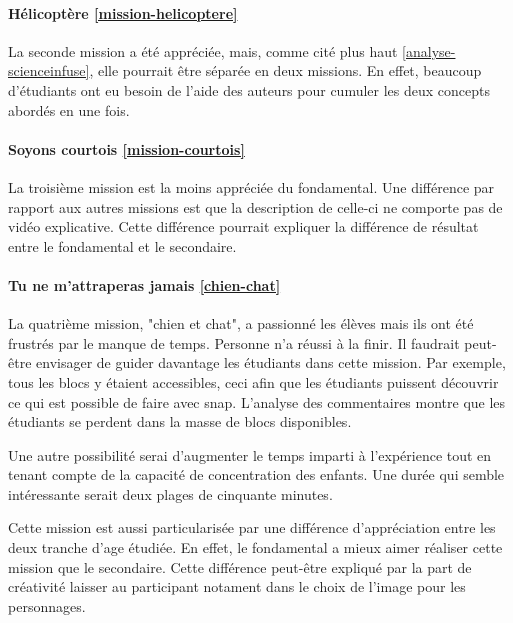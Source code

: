 \paragraph{Hélicoptère \ref{mission-helicoptere}}
La seconde \gls{mission} a été appréciée, mais, comme cité plus haut \ref{analyse-scienceinfuse}, elle pourrait être séparée en deux \glspl{mission}. En effet, beaucoup d'étudiants ont eu besoin de l'aide des auteurs pour cumuler les deux concepts abordés en une fois.

\paragraph{Soyons courtois \ref{mission-courtois}}
La troisième \gls{mission} est la moins appréciée du \gls{fondamental}. Une différence par rapport aux autres \glspl{mission} est que la description de celle-ci ne comporte pas de vidéo explicative. Cette différence pourrait expliquer la différence de résultat entre le \gls{fondamental} et le \gls{secondaire}.

\paragraph{Tu ne m'attraperas jamais \ref{chien-chat}}
La quatrième \gls{mission}, "chien et chat", a passionné les élèves mais ils ont été frustrés par le manque de temps. Personne n'a réussi à la finir. Il faudrait peut-être envisager de guider davantage les étudiants dans cette \gls{mission}. Par exemple, tous les \glspl{bloc} y étaient accessibles, ceci afin que les étudiants puissent découvrir ce qui est possible de faire avec \gls{snap}. L'analyse des commentaires montre que les étudiants se perdent dans la masse de \glspl{bloc} disponibles.

Une autre possibilité serai d'augmenter le temps imparti à l'expérience tout en tenant compte de la capacité de concentration des enfants. Une durée qui semble intéressante serait deux plages de cinquante minutes.

Cette \gls{mission} est aussi particularisée par une différence d'appréciation entre les deux tranche d'age étudiée. En effet, le \gls{fondamental} a mieux aimer réaliser cette \gls{mission} que le \gls{secondaire}. Cette différence peut-être expliqué par la part de créativité laisser au participant notament dans le choix de l'image pour les personnages.

